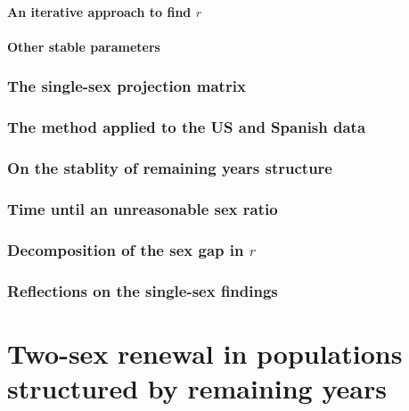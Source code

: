       \subsection{An iterative approach to find $r$}
        
        
      \subsection{Other stable parameters}
        
      
    \section{The single-sex projection matrix}
      
    \section{The method applied to the US and Spanish data}
      
    \section{On the stablity of remaining years structure}
      
    \section{Time until an unreasonable sex ratio}
      
    \section{Decomposition of the sex gap in $r$}
      
      
    \section{Reflections on the single-sex findings}
      
\part*{Two-sex renewal in populations structured by remaining years}
  
  

